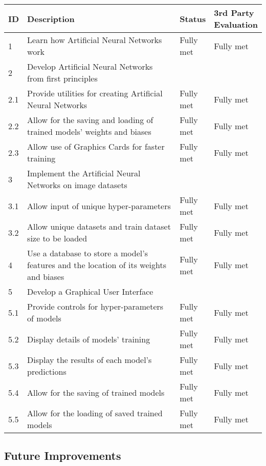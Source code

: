 \documentclass[./project-report/src/latex/project-report.tex]{subfiles}
\begin{document}
\begin{tabular}{|p{0.03\linewidth}|p{0.69\linewidth}|p{0.12\linewidth}|p{0.16\linewidth}|}
	  \hline
      \textbf{ID} & \textbf{Description} & \textbf{Status} & \textbf{3rd Party Evaluation} \\
      \hline
	  1 & Learn how Artificial Neural Networks work & Fully met & Fully met \\
      \hline
	  2 & Develop Artificial Neural Networks from first principles & & \\
      \hline
	  2.1 & Provide utilities for creating Artificial Neural Networks & Fully met & Fully met \\
      \hline
	  2.2 & Allow for the saving and loading of trained models' weights and biases & Fully met & Fully met \\
      \hline
	  2.3 & Allow use of Graphics Cards for faster training & Fully met & Fully met \\
      \hline
      3 & Implement the Artificial Neural Networks on image datasets & & \\
      \hline
	  3.1 & Allow input of unique hyper-parameters & Fully met & Fully met \\
      \hline
	  3.2 & Allow unique datasets and train dataset size to be loaded & Fully met & Fully met \\
      \hline
	  4 & Use a database to store a model's features and the location of its weights and biases & Fully met & Fully met \\
      \hline
      5 & Develop a Graphical User Interface & & \\
      \hline
	  5.1 & Provide controls for hyper-parameters of models & Fully met & Fully met \\
      \hline
	  5.2 & Display details of models' training & Fully met & Fully met \\
      \hline
	  5.3 & Display the results of each model's predictions & Fully met & Fully met \\
      \hline
	  5.4 & Allow for the saving of trained models & Fully met & Fully met \\
      \hline
	  5.5 & Allow for the loading of saved trained models & Fully met & Fully met \\
      \hline
\end{tabular}

\subsection{Future Improvements}
\end{document}

